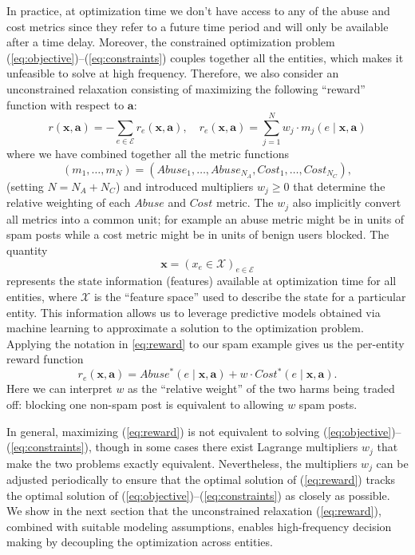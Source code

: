 In practice, at optimization time we don't have access to any of the abuse and cost metrics since they refer to a future time period and will only be available after a time delay.  Moreover,  the constrained optimization problem (\ref{eq:objective})--(\ref{eq:constraints}) couples together all the entities, which makes it unfeasible to solve at high frequency. Therefore, we also consider an unconstrained relaxation consisting of maximizing the following ``reward'' function with respect to $\mathbf{a}$:
\begin{equation}
\label{eq:reward}
r(\mathbf{x},\mathbf{a}) = -\sum_{e \in \mathcal{E}} r_e(\mathbf{x},\mathbf{a}), \quad r_e(\mathbf{x},\mathbf{a}) = \sum_{j=1}^N w_j \cdot m_{j}(e \mid \mathbf{x}, \mathbf{a})
\end{equation}
\noindent where we have combined together all the metric functions
\[
(m_{1}, \ldots, m_{N})= (Abuse_{1}, \ldots, Abuse_{N_A}, Cost_{1}, \ldots, Cost_{N_C}),
\]
(setting $N = N_A + N_C$) and introduced multipliers $w_j\geq0$ that determine the relative weighting of each $Abuse$ and $Cost$ metric. The $w_j$ also implicitly convert all metrics into a common unit; for example an abuse metric might be in units of spam posts while a cost metric might be in units of benign users blocked.  The quantity 
\begin{equation}\label{eq:state}
\mathbf{x} = \left({x}_e \in \mathcal{X}\right)_{e\in\mathcal{E}}
\end{equation}
represents the state information (features) available at optimization time for all entities, where $\mathcal{X}$ is the ``feature space'' used to describe the state for a particular entity. This information allows us to leverage predictive models obtained via machine learning to approximate a solution to the optimization problem. Applying the notation in \eqref{eq:reward} to our spam example gives us the per-entity reward function
\begin{equation}
    \label{eq:example_reward}
 r_e(\mathbf{x},\mathbf{a}) = Abuse^*(e \mid \mathbf{x},\mathbf{a}) + w \cdot Cost^*(e \mid \mathbf{x}, \mathbf{a}).
 \end{equation}
Here we can interpret $w$ as the ``relative weight'' of the two harms being traded off: blocking one non-spam post is equivalent to allowing $w$ spam posts.

In general, maximizing (\ref{eq:reward})  is not equivalent to solving (\ref{eq:objective})--(\ref{eq:constraints}), though in some cases there exist Lagrange multipliers $w_j$ that make the two problems exactly equivalent. Nevertheless, the multipliers $w_j$ can be adjusted periodically to ensure that the optimal solution of (\ref{eq:reward}) tracks the optimal solution of (\ref{eq:objective})--(\ref{eq:constraints}) as closely as possible.  We show in the next section that the unconstrained relaxation (\ref{eq:reward}), combined with suitable modeling assumptions, enables high-frequency decision making by decoupling the optimization across entities.
